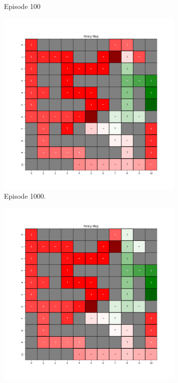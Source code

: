\documentclass{assignment}
\begin{document}
\begin{figure}[H]
\begin{subfigure}{0.3\textwidth}
    \caption{Episode 100}
    \end{subfigure}
    \begin{subfigure}{0.3\textwidth}
        \includegraphics[width=\textwidth]{figures/policy_q/default/policy_alpha_0.1_gamma_0.95_epsilon_0.2_iteration_1000.png}
    \caption{Episode 1000.}
    \end{subfigure}\hfill
    \begin{subfigure}{0.3\textwidth}
        \includegraphics[width=\textwidth]{figures/policy_q/default/policy_alpha_0.1_gamma_0.95_epsilon_0.2_iteration_5000.png}

\end{subfigure}
\end{figure}
\end{document}
